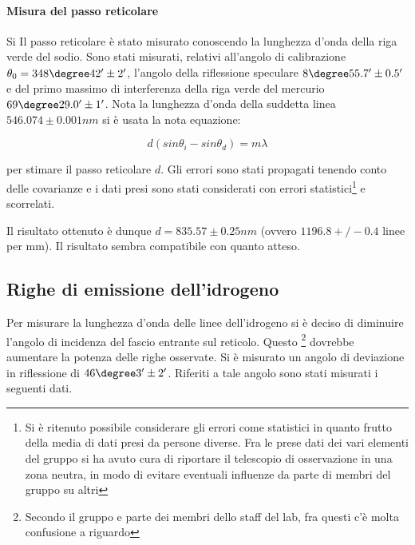 \documentclass[a4paper,10pt]{article}
\begin{document}
{{{{{{\paragraph{Misura del passo reticolare}
Si Il passo reticolare è stato misurato conoscendo la lunghezza d'onda della riga verde del sodio. Sono stati misurati, relativi all'angolo di calibrazione $\theta_0 =348\degree 42' \pm  2' $, l'angolo della riflessione speculare $8\degree 55.7' \pm 0.5'$ e del primo massimo di interferenza della riga verde del mercurio $69\degree 29.0'\pm 1'$. Nota la lunghezza d'onda della suddetta linea $546.074 \pm 0.001 nm$ si è usata la nota equazione:

\begin{equation*}
d (sin \theta_i - sin \theta_d) = m\lambda
\end{equation*}

per stimare il passo reticolare $d$. Gli errori sono stati propagati tenendo conto delle covarianze e i dati presi sono stati considerati con errori statistici\footnote{Si è ritenuto possibile considerare gli errori come statistici in quanto frutto della media di dati presi da persone diverse. Fra le prese dati dei vari elementi del gruppo si ha avuto cura di riportare il telescopio di osservazione in una zona neutra, in modo di evitare eventuali influenze da parte di membri del gruppo su altri} e scorrelati.


Il risultato ottenuto è dunque $d=835.57 \pm 0.25 nm$ (ovvero $1196.8+/-0.4$ linee per mm). Il risultato sembra compatibile con quanto atteso.

\subsection{Righe di emissione dell'idrogeno}
Per misurare la lunghezza d'onda delle linee dell'idrogeno si è deciso di diminuire l'angolo di incidenza del fascio entrante sul reticolo. Questo \footnote{Secondo il gruppo e parte dei membri dello staff del lab, fra questi c'è molta confusione a riguardo} %
dovrebbe aumentare la potenza delle righe osservate. Si è misurato un angolo di deviazione in riflessione di $46\degree 3' \pm 2'$. Riferiti a tale angolo sono stati misurati i seguenti dati.

}}}}}}
\end{document}
